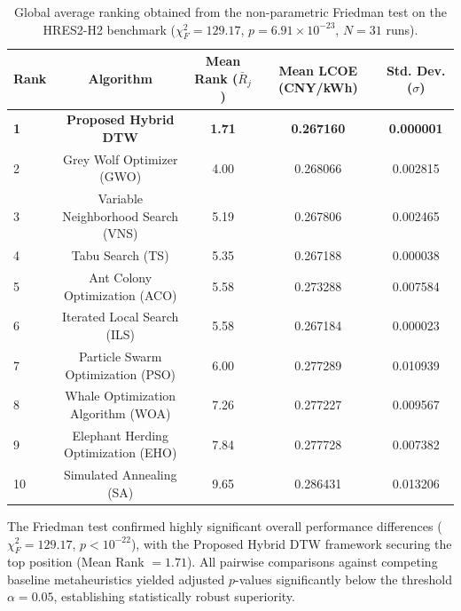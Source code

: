 \begin{table}[htbp]
\centering
\caption{Global average ranking obtained from the non-parametric Friedman test on the HRES2-H2 benchmark ($\chi^2_F = 129.17$, $p = 6.91 \times 10^{-23}$, $N=31$ runs).}
\label{tab:friedman_results}
\begin{tabular}{lcccc}
\toprule
\textbf{Rank} & \textbf{Algorithm} & \textbf{Mean Rank ($\bar{R}_j$)} & \textbf{Mean LCOE (CNY/kWh)} & \textbf{Std. Dev. ($\sigma$)} \\
\midrule
\textbf{1} & \textbf{Proposed Hybrid DTW} & \textbf{1.71} & \textbf{0.267160} & \textbf{0.000001} \\
2 & Grey Wolf Optimizer (GWO) & 4.00 & 0.268066 & 0.002815 \\
3 & Variable Neighborhood Search (VNS) & 5.19 & 0.267806 & 0.002465 \\
4 & Tabu Search (TS) & 5.35 & 0.267188 & 0.000038 \\
5 & Ant Colony Optimization (ACO) & 5.58 & 0.273288 & 0.007584 \\
6 & Iterated Local Search (ILS) & 5.58 & 0.267184 & 0.000023 \\
7 & Particle Swarm Optimization (PSO) & 6.00 & 0.277289 & 0.010939 \\
8 & Whale Optimization Algorithm (WOA) & 7.26 & 0.277227 & 0.009567 \\
9 & Elephant Herding Optimization (EHO) & 7.84 & 0.277728 & 0.007382 \\
10 & Simulated Annealing (SA) & 9.65 & 0.286431 & 0.013206 \\
\bottomrule
\end{tabular}
\end{table}

The Friedman test confirmed highly significant overall performance differences ($\chi^2_F = 129.17$, $p < 10^{-22}$), with the Proposed Hybrid DTW framework securing the top position (Mean Rank $= 1.71$). All pairwise comparisons against competing baseline metaheuristics yielded adjusted $p$-values significantly below the threshold $\alpha = 0.05$, establishing statistically robust superiority.
